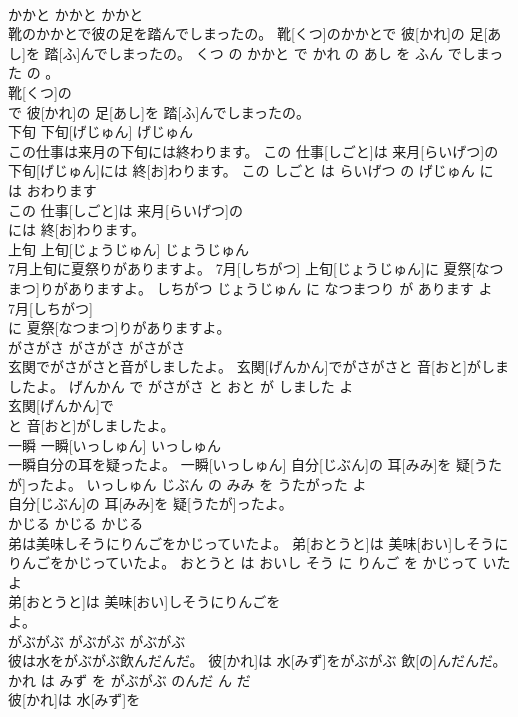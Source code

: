 \documentclass[8pt]{extreport}
\begin{document}
\begin{CJK}{UTF8}{min}
\\	かかと	かかと	かかと	
\\	靴のかかとで彼の足を踏んでしまったの。	靴[くつ]のかかとで 彼[かれ]の 足[あし]を 踏[ふ]んでしまったの。	くつ の かかと で かれ の あし を ふん でしまった の 。	
\\	靴[くつ]の
\\	で 彼[かれ]の 足[あし]を 踏[ふ]んでしまったの。			
\\	下旬	下旬[げじゅん]	げじゅん	
\\	この仕事は来月の下旬には終わります。	この 仕事[しごと]は 来月[らいげつ]の 下旬[げじゅん]には 終[お]わります。	この しごと は らいげつ の げじゅん に は おわります	
\\	この 仕事[しごと]は 来月[らいげつ]の
\\	には 終[お]わります。			
\\	上旬	上旬[じょうじゅん]	じょうじゅん	
\\	7月上旬に夏祭りがありますよ。	7月[しちがつ] 上旬[じょうじゅん]に 夏祭[なつまつ]りがありますよ。	しちがつ じょうじゅん に なつまつり が あります よ	
\\	7月[しちがつ]
\\	に 夏祭[なつまつ]りがありますよ。			
\\	がさがさ	がさがさ	がさがさ	
\\	玄関でがさがさと音がしましたよ。	玄関[げんかん]でがさがさと 音[おと]がしましたよ。	げんかん で がさがさ と おと が しました よ	
\\	玄関[げんかん]で
\\	と 音[おと]がしましたよ。			
\\	一瞬	一瞬[いっしゅん]	いっしゅん	
\\	一瞬自分の耳を疑ったよ。	一瞬[いっしゅん] 自分[じぶん]の 耳[みみ]を 疑[うたが]ったよ。	いっしゅん じぶん の みみ を うたがった よ	
\\	自分[じぶん]の 耳[みみ]を 疑[うたが]ったよ。			
\\	かじる	かじる	かじる	
\\	弟は美味しそうにりんごをかじっていたよ。	弟[おとうと]は 美味[おい]しそうにりんごをかじっていたよ。	おとうと は おいし そう に りんご を かじって いた よ	
\\	弟[おとうと]は 美味[おい]しそうにりんごを
\\	よ。			
\\	がぶがぶ	がぶがぶ	がぶがぶ	
\\	彼は水をがぶがぶ飲んだんだ。	彼[かれ]は 水[みず]をがぶがぶ 飲[の]んだんだ。	かれ は みず を がぶがぶ のんだ ん だ	
\\	彼[かれ]は 水[みず]を

\end{CJK}
\end{document}
